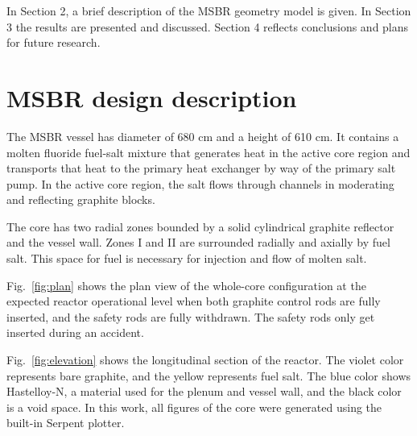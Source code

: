 \documentclass{anstrans}
\begin{document}
In Section 2, a brief description of the \gls{MSBR} geometry model is given. In 
Section 3 the results are presented and discussed. Section 4 reflects 
conclusions and plans for future research.  

\section{MSBR design description}
The \gls{MSBR} vessel has diameter of 680 cm and a height of 610 cm. It 
contains a molten fluoride fuel-salt mixture that generates heat in the active 
core region and transports that heat to the primary heat exchanger by way of 
the primary salt pump.
In the active core region, the salt flows through channels in moderating and 
reflecting graphite blocks.

The core has two radial zones bounded by a solid cylindrical graphite reflector 
and the vessel wall.  Zones I and II are surrounded radially and axially by 
fuel salt. This space for fuel is necessary for injection and flow of molten 
salt.

Fig.~\ref{fig:plan} shows the plan view of the whole-core configuration at the 
expected reactor operational level when both graphite control rods are fully 
inserted, and the safety rods are fully withdrawn. The safety rods only get 
inserted during an accident.  

Fig.~\ref{fig:elevation} shows the longitudinal section of the reactor. The 
violet color represents bare graphite, and the yellow represents fuel salt. The 
blue color shows Hastelloy-N, a material used for the plenum and vessel wall, 
and the black color is a void space. In this work, all figures of the core were 
generated using the built-in Serpent plotter.
\end{document}
